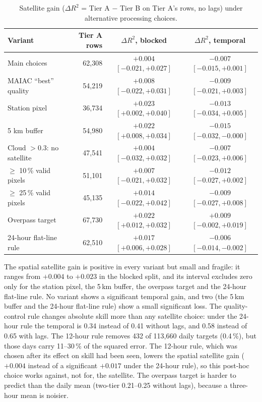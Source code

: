 \begin{table}[!htbp]
    \centering
    \footnotesize
    \setlength{\tabcolsep}{3pt}
    \begin{tabular}{L{3.4cm}|r|c|c}
        \hline
        Variant & Tier A rows & $\Delta R^2$, blocked & $\Delta R^2$, temporal \\
        \hline
        Main choices & 62,308 & $+0.004$ $[-0.021, +0.027]$ & $-0.007$ $[-0.015, +0.001]$ \\
        MAIAC ``best'' quality & 54,219 & $+0.008$ $[-0.022, +0.031]$ & $-0.009$ $[-0.021, +0.003]$ \\
        Station pixel & 36,734 & $+0.023$ $[+0.002, +0.040]$ & $-0.013$ $[-0.034, +0.005]$ \\
        5 km buffer & 54,980 & $+0.022$ $[+0.008, +0.034]$ & $-0.015$ $[-0.032, -0.000]$ \\
        Cloud $> 0.3$: no satellite & 47,541 & $+0.004$ $[-0.032, +0.032]$ & $-0.007$ $[-0.023, +0.006]$ \\
        $\ge$ 10\,\% valid pixels & 51,101 & $+0.007$ $[-0.021, +0.032]$ & $-0.012$ $[-0.027, +0.002]$ \\
        $\ge$ 25\,\% valid pixels & 45,135 & $+0.014$ $[-0.022, +0.042]$ & $-0.009$ $[-0.027, +0.008]$ \\
        Overpass target & 67,730 & $+0.022$ $[+0.012, +0.032]$ & $+0.009$ $[-0.002, +0.019]$ \\
        24-hour flat-line rule & 62,510 & $+0.017$ $[+0.006, +0.028]$ & $-0.006$ $[-0.014, -0.002]$ \\
        \hline
    \end{tabular}
    \caption{Satellite gain ($\Delta R^2$ = Tier A $-$ Tier B on Tier A's rows, no lags) under alternative processing choices.}
    \label{tab:sens}
\end{table}

The spatial satellite gain is positive in every variant but small and fragile: it ranges from
$+0.004$ to $+0.023$ in the blocked split, and its interval excludes zero only for the station pixel,
the 5\,km buffer, the overpass target and the 24-hour flat-line rule. No variant shows a significant
temporal gain, and two (the 5\,km buffer and the 24-hour flat-line rule) show a small significant
loss. The quality-control rule changes absolute skill more than any satellite choice: under the
24-hour rule the temporal \rsq{} is 0.34 instead of 0.41 without lags, and 0.58 instead of 0.65 with
lags. The 12-hour rule removes 432 of 113,660 daily targets (0.4\,\%), but those days carry
11--30\,\% of the squared error. The 12-hour rule, which was chosen after its effect on skill had been
seen, lowers the spatial satellite gain ($+0.004$ instead of a significant $+0.017$ under the 24-hour
rule), so this post-hoc choice works against, not for, the satellite. The overpass target is harder to predict than the daily mean
(two-tier \rsq{} 0.21--0.25 without lags), because a three-hour mean is noisier.

